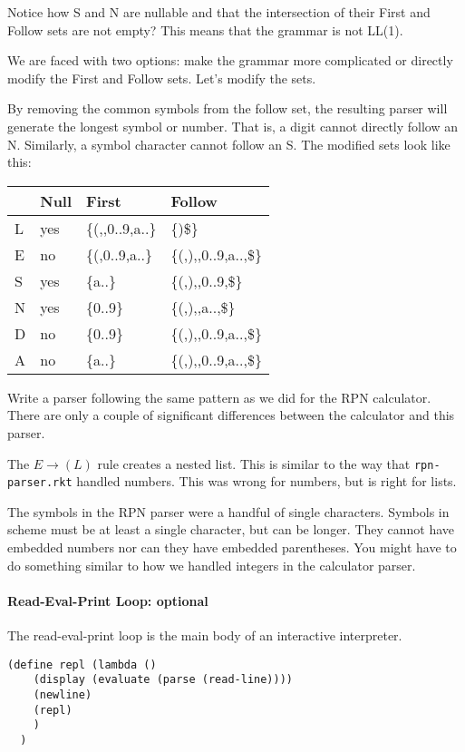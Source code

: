 \documentclass[letterpaper,12pt]{article}
\begin{document}
Notice how S and N are nullable and that the intersection of their First and
Follow sets are not empty?  This means that the grammar is not LL(1).

We are faced with two options: make the grammar more complicated or directly
modify the First and Follow sets.  Let's modify the sets.

By removing the common symbols from the follow set, the resulting parser will
generate the longest symbol or number.  That is, a digit cannot directly follow
an N.  Similarly, a symbol character cannot follow an S.  The modified sets look
like this:

\begin{center}
  \begin{tabular}[t]{l|l|l|l}
    &Null&First&Follow\\\hline
    L&yes&\{(,\textvisiblespace,0..9,a..\}&\{)\$\}\\
    E&no &\{(,0..9,a..\}&\{(,),\textvisiblespace,0..9,a..,\$\}\\
    S&yes&\{a..\}&\{(,),\textvisiblespace,0..9,\$\}\\
    N&yes&\{0..9\}&\{(,),\textvisiblespace,a..,\$\}\\
    D&no &\{0..9\}&\{(,),\textvisiblespace,0..9,a..,\$\}\\
    A&no &\{a..\}&\{(,),\textvisiblespace,0..9,a..,\$\}\\
  \end{tabular}
\end{center}


Write a parser following the same pattern as we did for the RPN calculator.
There are only a couple of significant differences between the calculator and
this parser.

The $E\rightarrow (L)$ rule creates a nested list.  This is similar to the way
that \verb|rpn-parser.rkt| handled numbers.  This was wrong for numbers, but is
right for lists.  

The symbols in the RPN parser were a handful of single characters.  Symbols in
scheme must be at least a single character, but can be longer.  They cannot have
embedded numbers nor can they have embedded parentheses.  You might have to do
something similar to how we handled integers in the calculator parser.  


\paragraph{Read-Eval-Print Loop: optional}
The read-eval-print loop is the main body of an interactive interpreter.  
\begin{Verbatim}
(define repl (lambda ()
    (display (evaluate (parse (read-line))))
    (newline)
    (repl)
    )
  )
\end{Verbatim}
\end{document}
